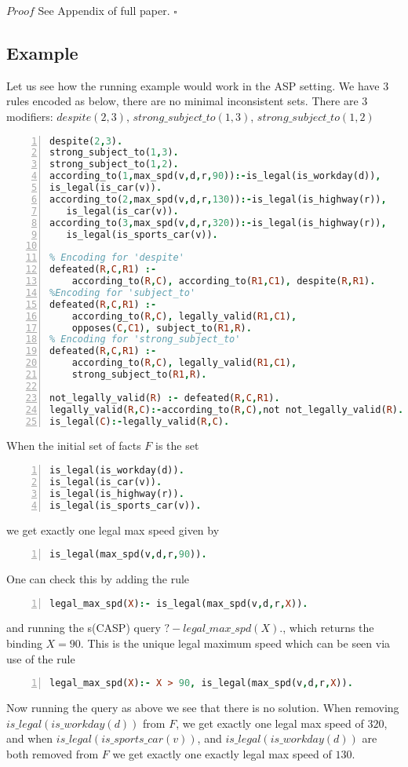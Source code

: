 $Proof$ See Appendix of full paper. $\square$


\subsection{Example}
Let us see how the running example would work in the ASP setting. We have 3 rules encoded as below, there are no minimal inconsistent sets. There are 3 modifiers: $despite(2,3)$,                           $strong\_subject\_to(1,3)$, $strong\_subject\_to(1,2)$
\begin{lstlisting}[language=Prolog, numbers=left]
despite(2,3).
strong_subject_to(1,3).
strong_subject_to(1,2).
according_to(1,max_spd(v,d,r,90)):-is_legal(is_workday(d)),
is_legal(is_car(v)).
according_to(2,max_spd(v,d,r,130)):-is_legal(is_highway(r)),
   is_legal(is_car(v)).
according_to(3,max_spd(v,d,r,320)):-is_legal(is_highway(r)),
   is_legal(is_sports_car(v)).

% Encoding for 'despite'
defeated(R,C,R1) :-
    according_to(R,C), according_to(R1,C1), despite(R,R1).
%Encoding for 'subject_to'
defeated(R,C,R1) :-
    according_to(R,C), legally_valid(R1,C1),
    opposes(C,C1), subject_to(R1,R).
% Encoding for 'strong_subject_to'
defeated(R,C,R1) :-
    according_to(R,C), legally_valid(R1,C1),
    strong_subject_to(R1,R).

not_legally_valid(R) :- defeated(R,C,R1).
legally_valid(R,C):-according_to(R,C),not not_legally_valid(R).
is_legal(C):-legally_valid(R,C).
\end{lstlisting}

When the initial set of facts $F$ is the set
\begin{lstlisting}[language=Prolog, numbers=left]
is_legal(is_workday(d)).
is_legal(is_car(v)).
is_legal(is_highway(r)).
is_legal(is_sports_car(v)).
\end{lstlisting}
we get exactly one legal max speed given by 
\begin{lstlisting}[language=Prolog, numbers=left]
is_legal(max_spd(v,d,r,90)).
\end{lstlisting}
One can check this by adding the rule 
\begin{lstlisting}[language=Prolog, numbers=left]
legal_max_spd(X):- is_legal(max_spd(v,d,r,X)). 
\end{lstlisting}
and running the s(CASP) query $?- legal\_max\_spd(X).$, which returns the binding $X = 90$. This is the unique legal maximum speed which can be seen via use of the rule 
\begin{lstlisting}[language=Prolog, numbers=left]
legal_max_spd(X):- X > 90, is_legal(max_spd(v,d,r,X)). 
\end{lstlisting}
Now running the query as above we see that there is no solution. 
When removing
$is\_legal(is\_workday(d))$ from $F$, we get exactly one legal max speed of $320$, and when  $is\_legal(is\_sports\_car(v))$, and $is\_legal(is\_workday(d))$ are both removed from $F$ we get exactly one exactly legal max speed of $130$.

